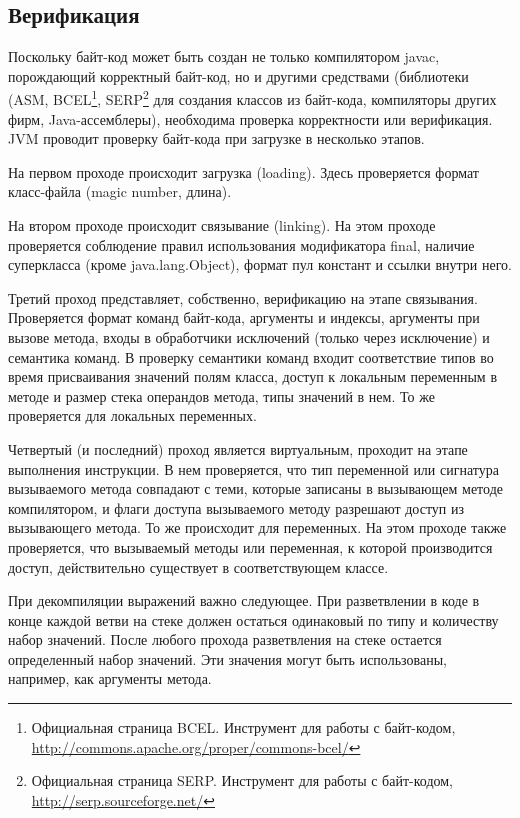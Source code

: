 \subsection{Верификация}
Поскольку байт-код может быть создан не только компилятором javac, порождающий корректный байт-код, но и   другими средствами (библиотеки (ASM, BCEL\footnote{Официальная страница BCEL. Инструмент для работы с байт-кодом, \url{http://commons.apache.org/proper/commons-bcel/}}, SERP\footnote{Официальная страница SERP. Инструмент для работы с байт-кодом, \url{http://serp.sourceforge.net/}} для создания классов из байт-кода, компиляторы других фирм, Java-ассемблеры), необходима проверка корректности или верификация. JVM проводит проверку байт-кода при загрузке в несколько этапов. 

На первом проходе происходит загрузка (loading). Здесь проверяется формат класс-файла (magic number, длина).

На втором проходе происходит связывание (linking). На этом проходе проверяется соблюдение правил использования модификатора final, наличие суперкласса (кроме java.lang.Object), формат пул констант и ссылки внутри него.

Третий проход представляет, собственно, верификацию на этапе связывания. Проверяется формат команд байт-кода, аргументы и индексы, аргументы при вызове метода, входы в обработчики исключений (только через исключение) и семантика команд. В проверку семантики команд входит соответствие типов во время присваивания значений полям класса, доступ к локальным переменным в методе и размер стека операндов метода, типы значений в нем. То же проверяется для локальных переменных.

Четвертый (и последний) проход является виртуальным, проходит на этапе выполнения инструкции. В нем проверяется, что тип переменной или сигнатура вызываемого метода совпадают с теми, которые записаны в вызывающем методе компилятором, и флаги доступа вызываемого методу разрешают доступ из вызывающего метода. То же происходит для переменных. На этом проходе также проверяется, что вызываемый методы или переменная, к которой производится доступ, действительно существует в соответствующем классе.

При декомпиляции выражений важно следующее. При разветвлении в коде в конце каждой ветви на стеке должен остаться одинаковый по типу и количеству набор значений. После любого прохода разветвления на стеке остается определенный набор значений. Эти значения могут быть использованы, например, как аргументы метода.

